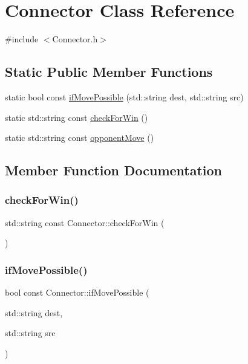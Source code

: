 \hypertarget{class_connector}{}\section{Connector Class Reference}
\label{class_connector}


{\ttfamily \#include $<$Connector.\+h$>$}

\subsection*{Static Public Member Functions}
\begin{DoxyCompactItemize}
\item 
static bool const \hyperlink{class_connector_a272b6b8e9273bc46499d6b733146579a}{if\+Move\+Possible} (std\+::string dest, std\+::string src)
\item 
static std\+::string const \hyperlink{class_connector_aac754784de647a31ceb1a599cc45550f}{check\+For\+Win} ()
\item 
static std\+::string const \hyperlink{class_connector_ab16b09be62901a7c11f829caac553a17}{opponent\+Move} ()
\end{DoxyCompactItemize}


\subsection{Member Function Documentation}
\mbox{\label{class_connector_aac754784de647a31ceb1a599cc45550f}} 
\subsubsection{\texorpdfstring{check\+For\+Win()}{checkForWin()}}
{\footnotesize\ttfamily std\+::string const Connector\+::check\+For\+Win (\begin{DoxyParamCaption}{ }\end{DoxyParamCaption})\hspace{0.3cm}{\ttfamily [static]}}

\mbox{\label{class_connector_a272b6b8e9273bc46499d6b733146579a}} 
\subsubsection{\texorpdfstring{if\+Move\+Possible()}{ifMovePossible()}}
{\footnotesize\ttfamily bool const Connector\+::if\+Move\+Possible (\begin{DoxyParamCaption}\item[{std\+::string}]{dest,  }\item[{std\+::string}]{src }\end{DoxyParamCaption})\hspace{0.3cm}{\ttfamily [static]}}

